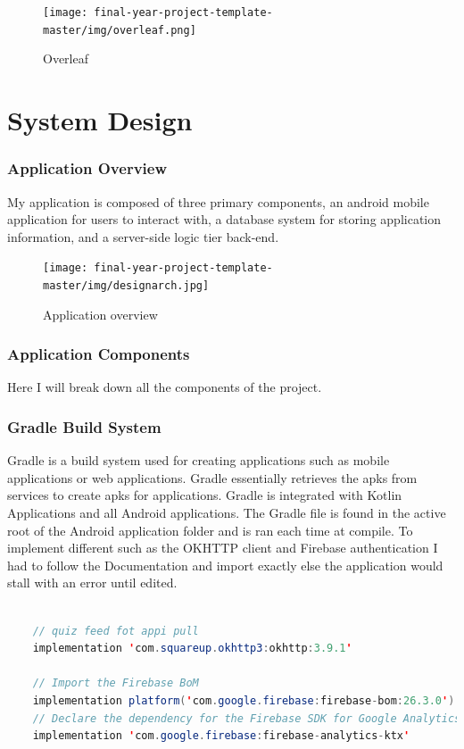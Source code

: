  \begin{figure}[H]
  \centering
    \texttt{[image: final-year-project-template-master/img/overleaf.png]}
     \caption{Overleaf }
\end{figure}


\chapter{System Design}

\subsection{Application Overview}
My application is composed of three primary components, an android mobile application for users to interact with, a database system for storing application information, and a server-side logic tier back-end.


  \begin{figure}[H]
  \centering
    \texttt{[image: final-year-project-template-master/img/designarch.jpg]}
     \caption{Application overview}
\end{figure}

\subsection{Application Components}
Here I will break down all the components of the project.


\subsection{Gradle Build System}
Gradle is a build system used for creating applications such as mobile applications or web applications. Gradle essentially retrieves the apks from services to create apks for applications. Gradle is integrated with Kotlin Applications and all Android applications. The Gradle file is found in the active root of the Android application folder and is ran each time at compile. To implement different such as the OKHTTP client and Firebase authentication I had to follow the Documentation and import exactly else the application would stall with an error until edited.


\begin{lstlisting}[language=Java, caption=OKHTTP and Firebase imports in Build.Gradle]

    // quiz feed fot appi pull
    implementation 'com.squareup.okhttp3:okhttp:3.9.1'

    // Import the Firebase BoM
    implementation platform('com.google.firebase:firebase-bom:26.3.0')
    // Declare the dependency for the Firebase SDK for Google Analytics
    implementation 'com.google.firebase:firebase-analytics-ktx'

    \end{lstlisting}

